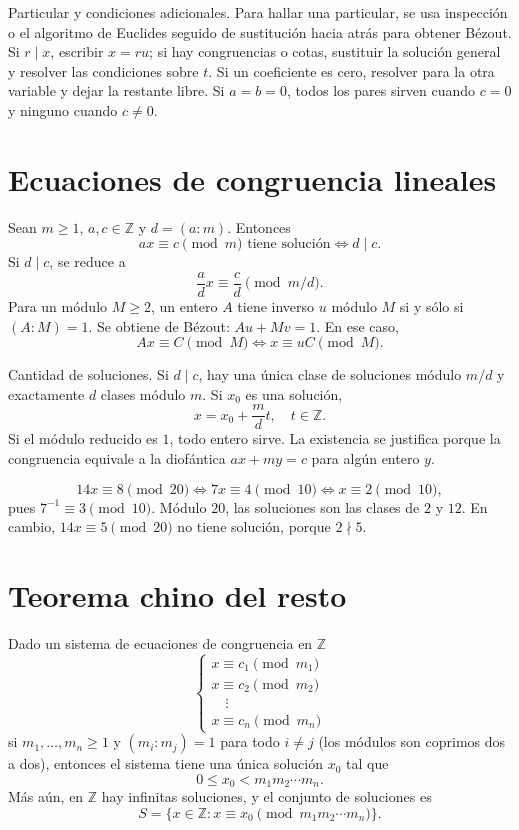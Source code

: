 \begin{nota}{Particular y condiciones adicionales.}
Para hallar una particular, se usa inspección o el algoritmo de Euclides
seguido de sustitución hacia atrás para obtener Bézout.
Si $r\mid x$, escribir $x=ru$; si hay congruencias o cotas,
sustituir la solución general y resolver las condiciones sobre $t$.
Si un coeficiente es cero, resolver para la otra variable y dejar la
restante libre. Si $a=b=0$, todos los pares sirven cuando $c=0$ y
ninguno cuando $c\neq0$.
\end{nota}

\section{Ecuaciones de congruencia lineales}
\begin{proposicion}[{title={Existencia, reducción e inverso}}]
Sean $m\geq1$, $a,c\in\mathbb Z$ y $d=(a:m)$. Entonces
\[
ax\equiv c\pmod m\text{ tiene solución}\iff d\mid c.
\]
Si $d\mid c$, se reduce a
\[
\frac ad x\equiv\frac cd\pmod{m/d}.
\]
Para un módulo $M\geq2$, un entero $A$ tiene inverso $u$ módulo $M$
si y sólo si $(A:M)=1$. Se obtiene de Bézout: $Au+Mv=1$.
En ese caso,
\[
Ax\equiv C\pmod M\iff x\equiv uC\pmod M.
\]
\end{proposicion}
\begin{nota}{Cantidad de soluciones.}
Si $d\mid c$, hay una única clase de soluciones módulo $m/d$ y
exactamente $d$ clases módulo $m$. Si $x_0$ es una solución,
\[
x=x_0+\frac md t,\quad t\in\mathbb Z.
\]
Si el módulo reducido es $1$, todo entero sirve.
La existencia se justifica porque la congruencia equivale a la
diofántica $ax+my=c$ para algún entero $y$.
\end{nota}
\begin{ejemplo}
\[
14x\equiv8\pmod{20}\iff7x\equiv4\pmod{10}
\iff x\equiv2\pmod{10},
\]
pues $7^{-1}\equiv3\pmod{10}$.
Módulo $20$, las soluciones son las clases de $2$ y $12$.
En cambio, $14x\equiv5\pmod{20}$ no tiene solución, porque $2\nmid5$.
\end{ejemplo}


\section{Teorema chino del resto}
\begin{proposicion}
Dado un sistema de ecuaciones de congruencia en $\mathbb{Z}$
\[
\begin{cases}
x\equiv c_1 \pmod{m_1}\\
x\equiv c_2 \pmod{m_2}\\
\quad\vdots\\
x\equiv c_n \pmod{m_n}
\end{cases}
\]
si $m_1,\dots,m_n\geq1$ y $(m_i:m_j)=1$ para todo $i\neq j$ (los módulos son coprimos dos a dos),
entonces el sistema tiene una única solución $x_0$ tal que
\[
0\le x_0<m_1m_2\cdots m_n.
\]
Más aún, en $\mathbb{Z}$ hay infinitas soluciones, y el conjunto de soluciones es
\[
S=\{x\in\mathbb{Z} : x\equiv x_0 \pmod{m_1m_2\cdots m_n}\}.
\]
\end{proposicion}

